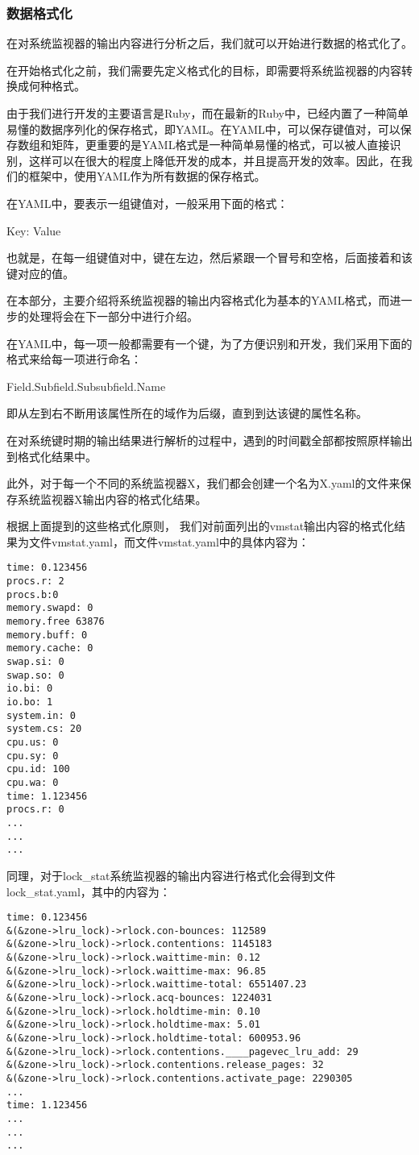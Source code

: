 \subsubsection{数据格式化}
在对系统监视器的输出内容进行分析之后，我们就可以开始进行数据的格式化了。

在开始格式化之前，我们需要先定义格式化的目标，即需要将系统监视器的内容转换成何种格式。

由于我们进行开发的主要语言是Ruby，而在最新的Ruby中，已经内置了一种简单易懂的数据序列化的保存格式，即YAML。在YAML中，可以保存键值对，可以保存数组和矩阵，更重要的是YAML格式是一种简单易懂的格式，可以被人直接识别，这样可以在很大的程度上降低开发的成本，并且提高开发的效率。因此，在我们的框架中，使用YAML作为所有数据的保存格式。

在YAML中，要表示一组键值对，一般采用下面的格式：
\begin{center}
Key: Value
\end{center}
也就是，在每一组键值对中，键在左边，然后紧跟一个冒号和空格，后面接着和该键对应的值。

在本部分，主要介绍将系统监视器的输出内容格式化为基本的YAML格式，而进一步的处理将会在下一部分中进行介绍。

在YAML中，每一项一般都需要有一个键，为了方便识别和开发，我们采用下面的格式来给每一项进行命名：
\begin{center}
Field.Subfield.Subsubfield.Name
\end{center}
即从左到右不断用该属性所在的域作为后缀，直到到达该键的属性名称。

在对系统键时期的输出结果进行解析的过程中，遇到的时间戳全部都按照原样输出到格式化结果中。

此外，对于每一个不同的系统监视器X，我们都会创建一个名为X.yaml的文件来保存系统监视器X输出内容的格式化结果。


根据上面提到的这些格式化原则， 我们对前面列出的vmstat输出内容的格式化结果为文件vmstat.yaml，而文件vmstat.yaml中的具体内容为：
{\footnotesize
\begin{verbatim}
time: 0.123456
procs.r: 2
procs.b:0
memory.swapd: 0
memory.free 63876
memory.buff: 0
memory.cache: 0
swap.si: 0
swap.so: 0
io.bi: 0
io.bo: 1
system.in: 0
system.cs: 20
cpu.us: 0
cpu.sy: 0
cpu.id: 100
cpu.wa: 0
time: 1.123456
procs.r: 0
...
...
...
\end{verbatim}
}

同理，对于lock\_stat系统监视器的输出内容进行格式化会得到文件lock\_stat.yaml，其中的内容为：
{\footnotesize
\begin{verbatim}
time: 0.123456
&(&zone->lru_lock)->rlock.con-bounces: 112589
&(&zone->lru_lock)->rlock.contentions: 1145183
&(&zone->lru_lock)->rlock.waittime-min: 0.12
&(&zone->lru_lock)->rlock.waittime-max: 96.85
&(&zone->lru_lock)->rlock.waittime-total: 6551407.23
&(&zone->lru_lock)->rlock.acq-bounces: 1224031
&(&zone->lru_lock)->rlock.holdtime-min: 0.10
&(&zone->lru_lock)->rlock.holdtime-max: 5.01
&(&zone->lru_lock)->rlock.holdtime-total: 600953.96
&(&zone->lru_lock)->rlock.contentions.____pagevec_lru_add: 29
&(&zone->lru_lock)->rlock.contentions.release_pages: 32
&(&zone->lru_lock)->rlock.contentions.activate_page: 2290305
...
time: 1.123456
...
...
...
\end{verbatim}
}

